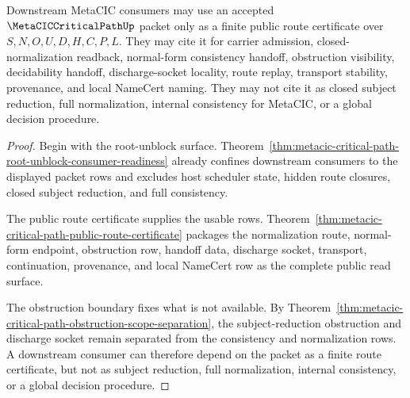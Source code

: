 \begin{theorem}
\label{thm:metacic-critical-path-downstream-consumer-readiness}
Downstream MetaCIC consumers may use an accepted $\MetaCICCriticalPathUp$ packet only as a finite public route certificate over $S,N,O,U,D,H,C,P,L$. They may cite it for carrier admission, closed-normalization readback, normal-form consistency handoff, obstruction visibility, decidability handoff, discharge-socket locality, route replay, transport stability, provenance, and local NameCert naming. They may not cite it as closed subject reduction, full normalization, internal consistency for MetaCIC, or a global decision procedure.
\end{theorem}
\begin{proof}
Begin with the root-unblock surface. Theorem~\ref{thm:metacic-critical-path-root-unblock-consumer-readiness} already confines downstream consumers to the displayed packet rows and excludes host scheduler state, hidden route closures, closed subject reduction, and full consistency.

The public route certificate supplies the usable rows. Theorem~\ref{thm:metacic-critical-path-public-route-certificate} packages the normalization route, normal-form endpoint, obstruction row, handoff data, discharge socket, transport, continuation, provenance, and local NameCert row as the complete public read surface.

The obstruction boundary fixes what is not available. By Theorem~\ref{thm:metacic-critical-path-obstruction-scope-separation}, the subject-reduction obstruction and discharge socket remain separated from the consistency and normalization rows. A downstream consumer can therefore depend on the packet as a finite route certificate, but not as subject reduction, full normalization, internal consistency, or a global decision procedure.
\end{proof}
